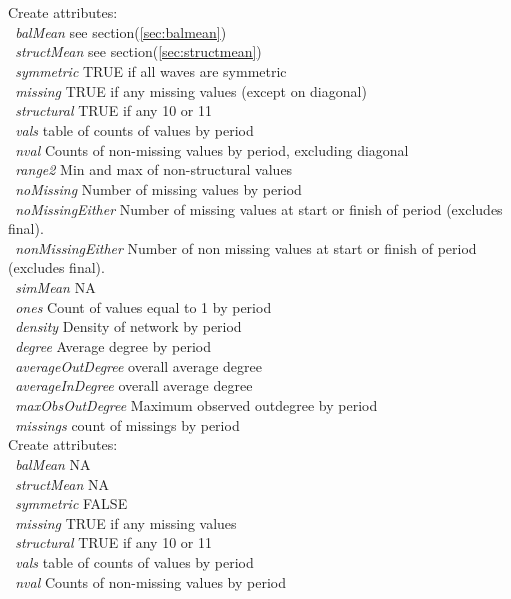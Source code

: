\documentclass[12pt,a4paper]{article}
\renewcommand{\=}{\,=\,}
\newcommand{\+}{\,+\,}
\newcommand{\nnm}[1]{\textsf{\textit{#1}}}
\newcommand{\sfn}[1]{\textbf{\texttt{#1}}}
\begin{document}
\begin{algorithmic}
\STATE Create attributes:\\
\sfn{ }\nnm{balMean} see section(\ref{sec:balmean})\\
\sfn{ }\nnm{structMean} see section(\ref{sec:structmean})\\
\sfn{ }\nnm{symmetric} TRUE if all waves are symmetric\\
\sfn{ }\nnm{missing} TRUE if any missing values (except on diagonal)\\
\sfn{ }\nnm{structural} TRUE if any 10 or 11\\
\sfn{ }\nnm{vals} table of counts of values by period\\
\sfn{ }\nnm{nval} Counts of non-missing values by period, excluding diagonal\\
\sfn{ }\nnm{range2} Min and max of non-structural values\\
\sfn{ }\nnm{noMissing} Number of missing values by period\\
\sfn{ }\nnm{noMissingEither} Number of missing values at start or finish of
period (excludes final).\\
\sfn{ }\nnm{nonMissingEither} Number of non missing values at start or finish of
period (excludes final).\\
\sfn{ }\nnm{simMean} NA\\
\sfn{ }\nnm{ones} Count of values equal to 1 by period\\
\sfn{ }\nnm{density} Density of network by period\\
\sfn{ }\nnm{degree} Average degree by period\\
\sfn{ }\nnm{averageOutDegree} overall average degree\\
\sfn{ }\nnm{averageInDegree} overall average degree\\
\sfn{ }\nnm{maxObsOutDegree} Maximum observed outdegree by period\\
\sfn{ }\nnm{missings} count of missings by period\\
\STATE Create attributes:\\
\sfn{ }\nnm{balMean} NA\\
\sfn{ }\nnm{structMean} NA\\
\sfn{ }\nnm{symmetric} FALSE\\
\sfn{ }\nnm{missing} TRUE if any missing values\\
\sfn{ }\nnm{structural} TRUE if any 10 or 11\\
\sfn{ }\nnm{vals} table of counts of values by period\\
\sfn{ }\nnm{nval} Counts of non-missing values by period\\

\end{algorithmic}
\end{document}
